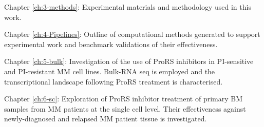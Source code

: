 \noindent
Chapter \ref{ch:3-methods}: Experimental materials and methodology used in this work.

\noindent
Chapter \ref{ch:4-Pipelines}: Outline of computational methods generated to support experimental work and benchmark validations of their effectiveness.

\noindent
Chapter \ref{ch:5-bulk}: Investigation of the use of ProRS inhibitors in PI-sensitive and PI-resistant MM cell lines.
Bulk-RNA seq is employed and the transcriptional landscape following ProRS treatment is characterised.

\noindent
Chapter \ref{ch:6-sc}: Exploration of ProRS inhibitor treatment of primary BM samples from MM patients at the single cell level.
Their effectiveness against newly-diagnosed and relapsed MM patient tissue is investigated.
